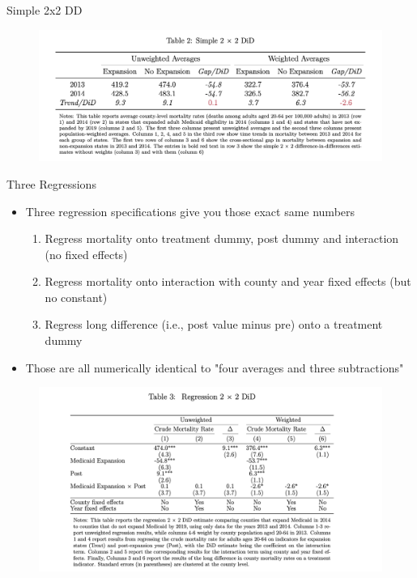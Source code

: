 \documentclass{beamer}
\begin{document}
\begin{frame}{Simple 2x2 DD}

\begin{figure}
    \centering
    \includegraphics[height=0.5\textheight]{./lecture_includes/simple2x2.png}
\end{figure}


\end{frame}

\begin{frame}{Three Regressions}

\begin{itemize}
\item Three regression specifications give you those exact same numbers
	\begin{enumerate}
	\item Regress mortality onto treatment dummy, post dummy and interaction (no fixed effects)
	\item Regress mortality onto interaction with county and year fixed effects (but no constant)
	\item Regress long difference (i.e., post value minus pre) onto a treatment dummy
	\end{enumerate}
\item Those are all numerically identical to "four averages and three subtractions"
\end{itemize}

\end{frame}

\begin{frame}

\begin{figure}
    \centering
    \includegraphics[height=0.7\textheight]{./lecture_includes/regression2x2.png}
\end{figure}

\end{frame}
\end{document}
